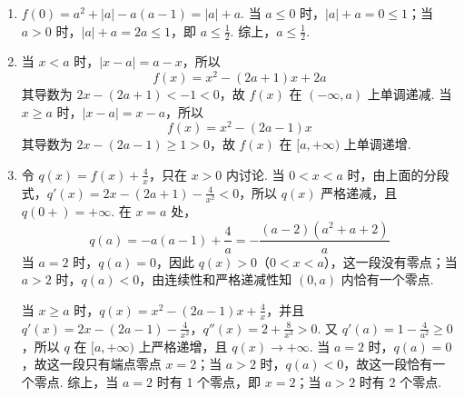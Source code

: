 \begin{solution}
\begin{enumerate}
\item \(f(0)=a^2+|a|-a(a-1)=|a|+a\). 当 \(a\leqslant0\) 时，\(|a|+a=0\leqslant1\)；当 \(a>0\) 时，\(|a|+a=2a\leqslant1\)，即 \(a\leqslant\frac12\). 综上，\(a\leqslant\frac12\).

\item 当 \(x<a\) 时，\(|x-a|=a-x\)，所以
\[
f(x)=x^2-(2a+1)x+2a
\]
其导数为 \(2x-(2a+1)<-1<0\)，故 \(f(x)\) 在 \((-\infty,a)\) 上单调递减. 当 \(x\geqslant a\) 时，\(|x-a|=x-a\)，所以
\[
f(x)=x^2-(2a-1)x
\]
其导数为 \(2x-(2a-1)\geqslant1>0\)，故 \(f(x)\) 在 \([a,+\infty)\) 上单调递增.

\item 令 \(q(x)=f(x)+\frac4x\)，只在 \(x>0\) 内讨论. 当 \(0<x<a\) 时，由上面的分段式，\(q'(x)=2x-(2a+1)-\frac4{x^2}<0\)，所以 \(q(x)\) 严格递减，且 \(q(0+)=+\infty\). 在 \(x=a\) 处，
\[
q(a)=-a(a-1)+\frac4a=-\frac{(a-2)(a^2+a+2)}{a}
\]
当 \(a=2\) 时，\(q(a)=0\)，因此 \(q(x)>0\)（\(0<x<a\)），这一段没有零点；当 \(a>2\) 时，\(q(a)<0\)，由连续性和严格递减性知 \((0,a)\) 内恰有一个零点.

当 \(x\geqslant a\) 时，\(q(x)=x^2-(2a-1)x+\frac4x\)，并且
\(q'(x)=2x-(2a-1)-\frac4{x^2}\)，\(q''(x)=2+\frac8{x^3}>0\).
又 \(q'(a)=1-\frac4{a^2}\geqslant0\)，所以 \(q\) 在 \([a,+\infty)\) 上严格递增，且 \(q(x)\to+\infty\). 当 \(a=2\) 时，\(q(a)=0\)，故这一段只有端点零点 \(x=2\)；当 \(a>2\) 时，\(q(a)<0\)，故这一段恰有一个零点. 综上，当 \(a=2\) 时有 1 个零点，即 \(x=2\)；当 \(a>2\) 时有 2 个零点.
\end{enumerate}
\end{solution}
